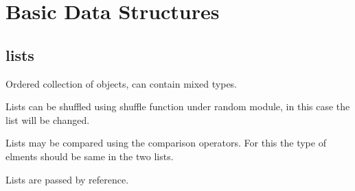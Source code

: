 \documentclass[a4paper, 12pt]{article}
\begin{document}
\section{Basic Data Structures}

\subsection{lists}
Ordered collection of objects, can contain mixed types.

Lists can be shuffled using shuffle function under random module, in this case the list will be changed.

Lists may be compared using the comparison operators. For this the type of elments should be same in the two lists.

Lists are passed by reference.
\end{document}
